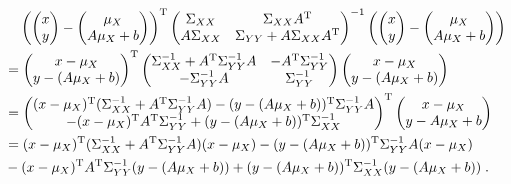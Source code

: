 \documentclass[a4paper,12pt]{article}
\begin{document}
\begin{equation} \label{eq:mvn-joint-pdf-s3a}
\begin{split}
&\hphantom{=}\;
\left( \begin{pmatrix} x \\ y \end{pmatrix} - \begin{pmatrix} \mu_X \\ A\mu_X + b \end{pmatrix} \right)^\mathrm{T}
\begin{pmatrix}
\Sigma_{XX}   & \Sigma_{XX} A^\mathrm{T} \\
A \Sigma_{XX} & \Sigma_{YY} + A \Sigma_{XX} A^\mathrm{T}
\end{pmatrix}^{-1}
\left( \begin{pmatrix} x \\ y \end{pmatrix} - \begin{pmatrix} \mu_X \\ A\mu_X + b \end{pmatrix} \right) \\
&=
\begin{pmatrix} x - \mu_X \\ y - (A\mu_X + b) \end{pmatrix}^\mathrm{T}
\begin{pmatrix}
  \Sigma_{XX}^{-1} + A^\mathrm{T} \Sigma_{YY}^{-1} A
& -A^\mathrm{T} \Sigma_{YY}^{-1} \\
  -\Sigma_{YY}^{-1} A
& \Sigma_{YY}^{-1}
\end{pmatrix}
\begin{pmatrix} x - \mu_X \\ y - (A\mu_X + b) \end{pmatrix} \\
&=
\begin{pmatrix}
  (x - \mu_X)^\mathrm{T} (\Sigma_{XX}^{-1} + A^\mathrm{T} \Sigma_{YY}^{-1} A)
- (y - (A\mu_X + b))^\mathrm{T} \Sigma_{YY}^{-1} A \\
- (x - \mu_X)^\mathrm{T} A^\mathrm{T} \Sigma_{YY}^{-1}
+ (y - (A\mu_X + b))^\mathrm{T} \Sigma_{XX}^{-1}
\end{pmatrix}^\mathrm{T}
\begin{pmatrix} x - \mu_X \\ y - A\mu_X + b \end{pmatrix} \\
&= (x - \mu_X)^\mathrm{T} (\Sigma_{XX}^{-1} + A^\mathrm{T} \Sigma_{YY}^{-1} A) (x - \mu_X) - (y - (A\mu_X + b))^\mathrm{T} \Sigma_{YY}^{-1} A (x - \mu_X) \\
&- (x - \mu_X)^\mathrm{T} A^\mathrm{T} \Sigma_{YY}^{-1} (y - (A\mu_X + b)) + (y - (A\mu_X + b))^\mathrm{T} \Sigma_{XX}^{-1} (y - (A\mu_X + b)) \; .
\end{split}
\end{equation}
\end{document}
